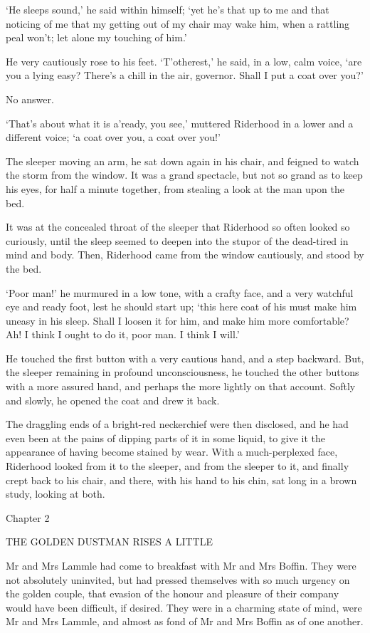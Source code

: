 ‘He sleeps sound,’ he said within himself; ‘yet he’s that up to me and
that noticing of me that my getting out of my chair may wake him, when a
rattling peal won’t; let alone my touching of him.’

He very cautiously rose to his feet. ‘T’otherest,’ he said, in a low,
calm voice, ‘are you a lying easy? There’s a chill in the air, governor.
Shall I put a coat over you?’

No answer.

‘That’s about what it is a’ready, you see,’ muttered Riderhood in a
lower and a different voice; ‘a coat over you, a coat over you!’

The sleeper moving an arm, he sat down again in his chair, and feigned
to watch the storm from the window. It was a grand spectacle, but not so
grand as to keep his eyes, for half a minute together, from stealing a
look at the man upon the bed.

It was at the concealed throat of the sleeper that Riderhood so often
looked so curiously, until the sleep seemed to deepen into the stupor
of the dead-tired in mind and body. Then, Riderhood came from the window
cautiously, and stood by the bed.

‘Poor man!’ he murmured in a low tone, with a crafty face, and a very
watchful eye and ready foot, lest he should start up; ‘this here coat
of his must make him uneasy in his sleep. Shall I loosen it for him,
and make him more comfortable? Ah! I think I ought to do it, poor man. I
think I will.’

He touched the first button with a very cautious hand, and a step
backward. But, the sleeper remaining in profound unconsciousness, he
touched the other buttons with a more assured hand, and perhaps the more
lightly on that account. Softly and slowly, he opened the coat and drew
it back.

The draggling ends of a bright-red neckerchief were then disclosed, and
he had even been at the pains of dipping parts of it in some liquid,
to give it the appearance of having become stained by wear. With a
much-perplexed face, Riderhood looked from it to the sleeper, and from
the sleeper to it, and finally crept back to his chair, and there, with
his hand to his chin, sat long in a brown study, looking at both.



Chapter 2

THE GOLDEN DUSTMAN RISES A LITTLE


Mr and Mrs Lammle had come to breakfast with Mr and Mrs Boffin. They
were not absolutely uninvited, but had pressed themselves with so much
urgency on the golden couple, that evasion of the honour and pleasure
of their company would have been difficult, if desired. They were in a
charming state of mind, were Mr and Mrs Lammle, and almost as fond of Mr
and Mrs Boffin as of one another.

